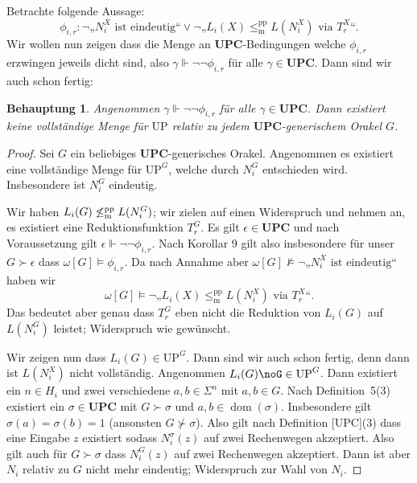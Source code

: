 \documentclass[nofonts]{uebung}
\newtheorem{claim}[theorem]{Behauptung}
\def\UP{\ensuremath{\mathrm{UP}}}
\DeclareMathOperator{\dom}{dom}
\def\leqmpp{\ensuremath{\leq_\mathrm{m}^\mathrm{pp}}}
\begin{document}
Betrachte folgende Aussage:
\[ \phi_{i,r}\colon \neg\text{„$N_i^X$ ist eindeutig“} \lor \neg„L_{i}(X)\leqmpp L(N_i^X)\text{ via }T^X_r“. \]
Wir wollen nun zeigen dass die Menge an $\mathbf{UPC}$-Bedingungen welche $\phi_{i,r}$ erzwingen jeweils dicht sind, also $\gamma\Vdash\neg\neg\phi_{i,r}$ für alle $\gamma\in\mathbf{UPC}$.
Dann sind wir auch schon fertig:

\begin{claim}
    Angenommen $\gamma\Vdash\neg\neg\phi_{i,r}$ für alle $\gamma\in\mathbf{UPC}$.
    Dann existiert keine vollständige Menge für $\UP$ relativ zu jedem $\mathbf{UPC}$-generischem Orakel $G$.
\end{claim}
\begin{proof}
    Sei $G$ ein beliebiges $\mathbf{UPC}$-generisches Orakel.
    Angenommen es existiert eine vollständige Menge für $\UP^G$, welche durch $N^G_i$ entschieden wird.
    Insbesondere ist $N^G_i$ eindeutig.

    Wir haben $L_i(G)\not\leqmpp L(N^G_i)$; wir zielen auf einen Widerspruch und nehmen an, es existiert eine Reduktionsfunktion $T_r^G$.
    Es gilt $\epsilon\in\mathbf{UPC}$ und nach Voraussetzung gilt $\epsilon\Vdash\neg\neg\phi_{i,r}$.
    Nach Korollar 9 gilt also insbesondere für unser $G\succ\epsilon$ dass $\omega[G] \vDash \phi_{i, r}$.
    Da nach Annahme aber $\omega[G] \not\vDash \neg\text{„$N_i^X$ ist eindeutig“}$ haben wir
    \[ \omega[G] \vDash  \neg„L_{i}(X)\leqmpp L(N_i^X)\text{ via }T^X_r“. \]
    Das bedeutet aber genau dass $T^G_r$ eben nicht die Reduktion von $L_{i}(G)$ auf $L(N_i^G)$ leistet; Widerspruch wie gewünscht.

    Wir zeigen nun dass $L_i(G)\in\UP^G$. Dann sind wir auch schon fertig, denn dann ist $L(N_i^X)$ nicht vollständig.
    Angenommen $L_i(G)\noG\in\UP^G$. Dann existiert ein $n\in H_i$ und zwei verschiedene $a,b\in\Sigma^n$ mit $a,b\in G$.
    Nach Definition~5(3) existiert ein $\sigma\in\mathbf{UPC}$ mit $G\succ \sigma$ und $a,b\in\dom(\sigma)$.
    Insbesondere gilt $\sigma(a)=\sigma(b)=1$ (ansonsten $G\not\succ\sigma$).
    Also gilt nach Definition [UPC](3) dass eine Eingabe $z$ existiert sodass $N_i^\sigma(z)$ auf zwei Rechenwegen akzeptiert. 
    Also gilt auch für $G\succ\sigma$ dass $N_i^G(z)$ auf zwei Rechenwegen akzeptiert.
    Dann ist aber $N_i$ relativ zu $G$ nicht mehr eindeutig; Widerspruch zur Wahl von $N_i$.
\end{proof}
\end{document}
